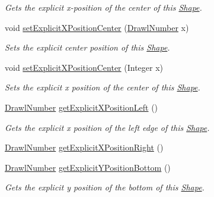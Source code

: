\begin{DoxyCompactItemize}
\begin{DoxyCompactList}\small\item\em Gets the explicit x-\/position of the center of this \hyperlink{classcom_1_1aarrelaakso_1_1drawl_1_1_shape}{Shape}. \end{DoxyCompactList}\item 
void \hyperlink{classcom_1_1aarrelaakso_1_1drawl_1_1_shape_a43d67e2711163383c32d8c14a6b17e2c}{set\+Explicit\+X\+Position\+Center} (\hyperlink{classcom_1_1aarrelaakso_1_1drawl_1_1_drawl_number}{Drawl\+Number} x)
\begin{DoxyCompactList}\small\item\em Sets the explicit center position of this \hyperlink{classcom_1_1aarrelaakso_1_1drawl_1_1_shape}{Shape}. \end{DoxyCompactList}\item 
void \hyperlink{classcom_1_1aarrelaakso_1_1drawl_1_1_shape_aa7855df6d98b3bfa556b7d857755181b}{set\+Explicit\+X\+Position\+Center} (Integer x)
\begin{DoxyCompactList}\small\item\em Sets the explicit x position of the center of this \hyperlink{classcom_1_1aarrelaakso_1_1drawl_1_1_shape}{Shape}. \end{DoxyCompactList}\item 
\hyperlink{classcom_1_1aarrelaakso_1_1drawl_1_1_drawl_number}{Drawl\+Number} \hyperlink{classcom_1_1aarrelaakso_1_1drawl_1_1_shape_a339cf8811f57b7cb5251109b04be953c}{get\+Explicit\+X\+Position\+Left} ()
\begin{DoxyCompactList}\small\item\em Gets the explicit x position of the left edge of this \hyperlink{classcom_1_1aarrelaakso_1_1drawl_1_1_shape}{Shape}. \end{DoxyCompactList}\item 
\hyperlink{classcom_1_1aarrelaakso_1_1drawl_1_1_drawl_number}{Drawl\+Number} \hyperlink{classcom_1_1aarrelaakso_1_1drawl_1_1_shape_a19970b658b55e4e61de31aaaef8cf7fe}{get\+Explicit\+X\+Position\+Right} ()
\item 
\hyperlink{classcom_1_1aarrelaakso_1_1drawl_1_1_drawl_number}{Drawl\+Number} \hyperlink{classcom_1_1aarrelaakso_1_1drawl_1_1_shape_aa26eb0263851ed8f8221bf3740e6e584}{get\+Explicit\+Y\+Position\+Bottom} ()
\begin{DoxyCompactList}\small\item\em Gets the explicit y position of the bottom of this \hyperlink{classcom_1_1aarrelaakso_1_1drawl_1_1_shape}{Shape}. \end{DoxyCompactList}\item 

\end{DoxyCompactItemize}
